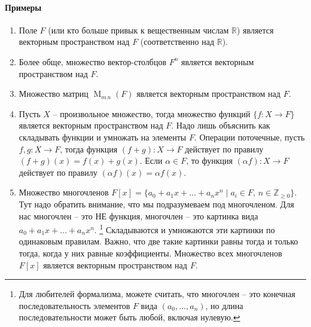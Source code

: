 \paragraph{Примеры}
\begin{enumerate}
\item Поле $F$ (или кто больше привык к вещественным числам $\mathbb R$) является векторным пространством над $F$ (соответственно над $\mathbb R$).

\item Более обще, множество вектор-столбцов $F^n$ является векторным пространством над $F$.

\item Множество матриц $\operatorname{M}_{m\,n}(F)$ является векторным пространством над $F$.

\item Пусть $X$ -- произвольное множество, тогда множество функций $\{f\colon X\to F\}$ является векторным пространством над $F$.
Надо лишь объяснить как складывать функции и умножать на элементы $F$.
Операции поточечные, пусть $f,g\colon X\to F$, тогда функция $(f+g)\colon X\to F$ действует по правилу $(f+g)(x) = f(x) + g(x)$.
Если $\alpha \in F$, то функция $(\alpha f)\colon X\to F$ действует по правилу $(\alpha f)(x) = \alpha f(x)$.

\item Множество многочленов $F[x] = \{a_0+a_1x + \ldots + a_n x^n\mid a_i \in F,\,n\in \mathbb Z_{\geqslant 0}\}$.
Тут надо обратить внимание, что мы подразумеваем под многочленом.
Для нас многочлен -- это НЕ функция, многочлен -- это картинка вида $a_0 + a_1 x + \ldots + a_n x^n$.%
\footnote{Для любителей формализма, можете считать, что многочлен -- это конечная последовательность элементов $F$ вида $(a_0,\ldots,a_n)$, но длина последовательности может быть любой, включая нулевую.}
Складываются и умножаются эти картинки по одинаковым правилам.
Важно, что две такие картинки равны тогда и только тогда, когда у них равные коэффициенты.
Множество всех многочленов $F[x]$ является векторным пространством над $F$.
\end{enumerate}


